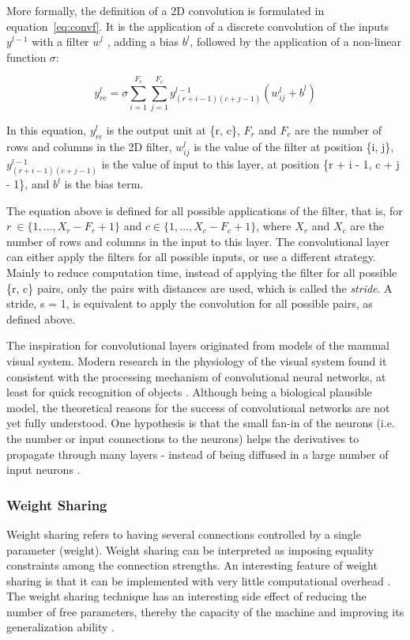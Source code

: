 \noindent More formally, the definition of a 2D convolution is formulated in equation~\ref{eq:convf}. It is the
application of a discrete convolution of the inputs $y^{l-1}$ with a filter $w^{l}$ , adding a bias $b^{l}$, followed by the application of a non-linear function $\sigma$:

\begin{equation}
y_{rc}^{l} =  \sigma \sum_{i=1}^{F_r}\sum_{j=1}^{F_c}  y_{(r+i-1)(c+j-1)}^{l-1} (w_{ij}^{l} + b^{l})
\label{eq:convf}
\end{equation}

In this equation, $y_{rc}^{l}$ is the output unit at \{r, c\}, $F_r$ and $F_c$ are the number of rows and columns in the 2D filter, $w_{ij}^{l}$ is the value of the filter at position \{i, j\},  $y_{(r+i-1)(c+j-1)}^{l-1}$ is the value of input to this layer, at position \{r + i - 1, c + j - 1\}, and $b^{l}$ is the bias term.

The equation above is defined for all possible applications of the filter, that is, for $r~\in \{1, ..., X_r - F_r + 1\}$ and $c \in \{1, ..., X_c - F_c + 1\}$, where $X_r$ and $X_c$ are the number of rows and columns in the input to this layer. The convolutional layer can either apply the filters for all possible inputs, or use a different strategy. Mainly to reduce computation time, instead of applying the filter for all possible \{r, c\} pairs, only the pairs with distances are used, which is called the \textit{stride}. A stride, s = 1, is equivalent to apply the convolution for all possible pairs, as defined above. 

\noindent The inspiration for convolutional layers originated from models of the mammal visual system. Modern research in the physiology of the visual system found it consistent with the processing mechanism of convolutional neural networks, at least for quick recognition of objects \cite{bengio2009learning}. Although being a biological plausible model, the theoretical reasons for the success of convolutional networks are not yet fully understood. One hypothesis is that the small fan-in of the neurons (i.e. the number or input connections to the neurons) helps the derivatives to propagate through many layers - instead of being diffused in a large number of input neurons \cite{nips}.

\subsubsection{Weight Sharing}

Weight sharing refers to having several connections controlled by a single parameter (weight). Weight sharing can be interpreted as imposing equality constraints among the connection strengths. An interesting feature of weight sharing is that it can be implemented with very little computational overhead \cite{lecun1989generalization}. The weight sharing technique has an interesting side effect of reducing the number of free parameters, thereby the capacity of the machine and improving its generalization ability \cite{lecun2010convolutional}.



